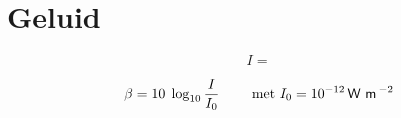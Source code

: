 \newpage
\section{Geluid}
\label{sec:Geluid}

\[
  I = 
\]

\[
  \beta = 10\; \log_{10} \frac{I}{I_0} \qquad \mbox{ met } I_0 = 10^{-12} \,\textsf{W}\, \,\textsf{m}\,^{-2}
\]